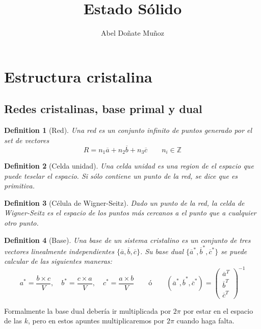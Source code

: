 \documentclass[leqno]{article}
\title{Estado Sólido}
\author{Abel Doñate Muñoz}
\date{}
\newtheorem*{definition}{Definition}
\begin{document}
\maketitle
\tableofcontents
\newpage

\section{Estructura cristalina}

\subsection{Redes cristalinas, base primal y dual}
\begin{definition}[Red] Una red es un conjunto infinito de puntos generado por el set de vectores
   \[
  R = n_1 \overline{a} + n_2 \overline{b} + n_3 \overline{c} \qquad n_i \in \mathbb{Z}
  \] 
\end{definition}

\begin{definition}[Celda unidad] Una celda unidad es una region de el espacio que puede teselar el espacio. Si sólo contiene un punto de la red, se dice que es primitiva.
\end{definition}

\begin{definition}[Célula de Wigner-Seitz] Dado un punto de la red, la celda de Wigner-Seitz es el espacio de los puntos más cercanos a el punto que a cualquier otro punto.
\end{definition}

\begin{definition}[Base] Una base de un sistema cristalino es un conjunto de tres vectores linealmente independientes $\{\overline{a}, \overline{b}, \overline{c}\}$. Su base dual $ \{\overline{a}^*, \overline{b}^*, \overline{c}^*\}$ se puede calcular de las siguientes maneras:
\[
  a^* = \frac{b\times c}{V}, \quad b^* = \frac{c\times a}{V}  , \quad c^* = \frac{a\times b}{V} \qquad \text{ó}  \qquad (\overline{a}^*, \overline{b}^*, \overline{c}^*)=\begin{pmatrix} \overline{a}^T\\\overline{b}^T\\\overline{c}^T \end{pmatrix} ^{-1}
\] 
\end{definition}
Formalmente la base dual debería ir multiplicada por $2\pi$ por estar en el espacio de las $k$, pero en estos apuntes multiplicaremos por  $2\pi$ cuando haga falta.
\end{document}
